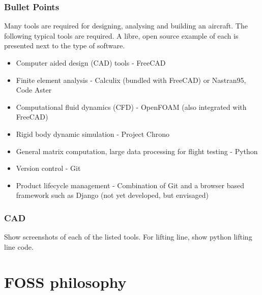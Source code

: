 \documentclass{beamer}
\begin{document}
\begin{frame}
\frametitle{Bullet Points}

Many tools are required for designing, analysing and building an aircraft.  The following typical tools are required.  A libre, open source example of each is presented next to the type of software.

\begin{itemize}
\item Computer aided design (CAD) tools - FreeCAD
\item Finite element analysis - Calculix (bundled with FreeCAD) or Nastran95, Code Aster
\item Computational fluid dynamics (CFD) - OpenFOAM (also integrated with FreeCAD)
\item Rigid body dynamic simulation - Project Chrono
\item General matrix computation, large data processing for flight testing - Python
\item Version control - Git
\item Product lifecycle management - Combination of Git and a browser based framework such as Django (not yet developed, but envisaged)
\end{itemize}
\end{frame}

\begin{frame}
\frametitle{CAD}

Show screenshots of each of the listed tools.  For lifting line, show python lifting line code.

\end{frame}


\section{FOSS philosophy}

\end{document}
